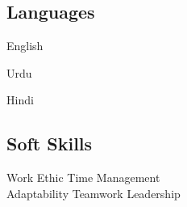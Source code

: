 \documentclass[]{deedy-resume-openfont}
\begin{document}
\begin{minipage}[t]{0.33\textwidth}
    \subsection{Languages}
    \vspace{\topsep}
    \begin{tightemize}
        \item English
        \item Urdu
        \item Hindi
    \end{tightemize}
    \sectionsep

    \subsection{Soft Skills}
    Work Ethic \textbullet{} Time Management \\
    Adaptability \textbullet{}  Teamwork \textbullet{} Leadership \\



\end{minipage}
\hfill
\end{document}
